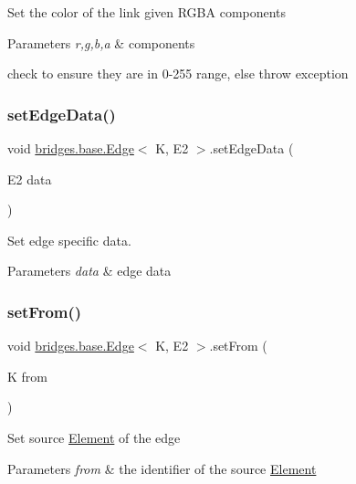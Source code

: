Set the color of the link given R\+G\+BA components


\begin{DoxyParams}{Parameters}
{\em r,g,b,a} & components\\
\hline
\end{DoxyParams}
check to ensure they are in 0-\/255 range, else throw exception \mbox{\label{classbridges_1_1base_1_1_edge_a733d7f5eb4950d1fc4e14b7096faeb5c}} 
\subsubsection{\texorpdfstring{setEdgeData()}{setEdgeData()}}
{\footnotesize\ttfamily void \mbox{\hyperlink{classbridges_1_1base_1_1_edge}{bridges.\+base.\+Edge}}$<$ K, E2 $>$.set\+Edge\+Data (\begin{DoxyParamCaption}\item[{E2}]{data }\end{DoxyParamCaption})}

Set edge specific data.


\begin{DoxyParams}{Parameters}
{\em data} & edge data \\
\hline
\end{DoxyParams}
\mbox{\label{classbridges_1_1base_1_1_edge_aef1a55d996fc36217629b884435b9f35}} 
\subsubsection{\texorpdfstring{setFrom()}{setFrom()}}
{\footnotesize\ttfamily void \mbox{\hyperlink{classbridges_1_1base_1_1_edge}{bridges.\+base.\+Edge}}$<$ K, E2 $>$.set\+From (\begin{DoxyParamCaption}\item[{K}]{from }\end{DoxyParamCaption})}

Set source \mbox{\hyperlink{classbridges_1_1base_1_1_element}{Element}} of the edge


\begin{DoxyParams}{Parameters}
{\em from} & the identifier of the source \mbox{\hyperlink{classbridges_1_1base_1_1_element}{Element}} \\
\hline
\end{DoxyParams}
\mbox{\label{classbridges_1_1base_1_1_edge_ad5f1d55a3c8caeb975f497dfe4f29242}} 
